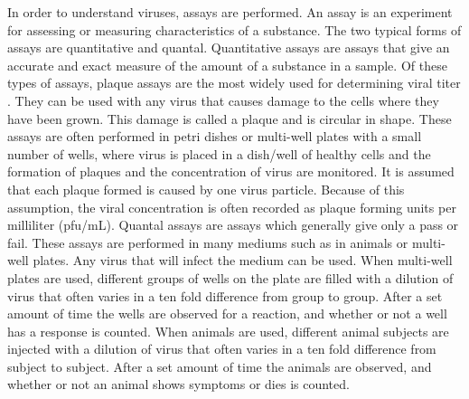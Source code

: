 In order to understand viruses, assays are performed. An assay is an experiment for assessing or measuring characteristics of a substance. The two typical forms of assays are quantitative and quantal. Quantitative assays are assays that give an accurate and exact measure of the amount of a substance in a sample. Of these types of assays, plaque assays are the most widely used for determining viral titer \cite{Kumar}. They can be used with any virus that causes damage to the cells where they have been grown. This damage is called a plaque and is circular in shape. These assays are often performed in petri dishes or multi-well plates with a small number of wells, where virus is placed in a dish/well of healthy cells and the formation of plaques and the concentration of virus are monitored. It is assumed that each plaque formed is caused by one virus particle. Because of this assumption, the viral concentration is often recorded as plaque forming units per milliliter (pfu/mL). Quantal assays are assays which generally give only a pass or fail. These assays are performed in many mediums such as in animals or multi-well plates. Any virus that will infect the medium can be used. When multi-well plates are used, different groups of wells on the plate are filled with a dilution of virus that often varies in a ten fold difference from group to group. After a set amount of time the wells are observed for a reaction, and whether or not a well has a response is counted. When animals are used, different animal subjects are injected with a dilution of virus that often varies in a ten fold difference from subject to subject. After a set amount of time the animals are observed, and whether or not an animal shows symptoms or dies is counted.

